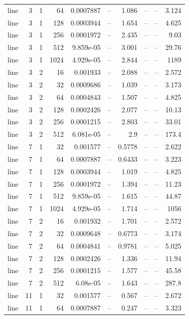 \begin{tabular}{lrrrrrrrrr}
line & 3 & 1 & 64 & 0.0007887 & -- & 1.086 & -- & -- & 3.124 \\
line & 3 & 1 & 128 & 0.0003944 & -- & 1.654 & -- & -- & 4.625 \\
line & 3 & 1 & 256 & 0.0001972 & -- & 2.435 & -- & -- & 9.03 \\
line & 3 & 1 & 512 & 9.859e-05 & -- & 3.001 & -- & -- & 29.76 \\
line & 3 & 1 & 1024 & 4.929e-05 & -- & 2.844 & -- & -- & 1189 \\
line & 3 & 2 & 16 & 0.001933 & -- & 2.088 & -- & -- & 2.572 \\
line & 3 & 2 & 32 & 0.0009686 & -- & 1.039 & -- & -- & 3.173 \\
line & 3 & 2 & 64 & 0.0004843 & -- & 1.507 & -- & -- & 4.825 \\
line & 3 & 2 & 128 & 0.0002426 & -- & 2.077 & -- & -- & 10.13 \\
line & 3 & 2 & 256 & 0.0001215 & -- & 2.803 & -- & -- & 33.01 \\
line & 3 & 2 & 512 & 6.081e-05 & -- & 2.9 & -- & -- & 173.4 \\
line & 7 & 1 & 32 & 0.001577 & -- & 0.5778 & -- & -- & 2.622 \\
line & 7 & 1 & 64 & 0.0007887 & -- & 0.6433 & -- & -- & 3.223 \\
line & 7 & 1 & 128 & 0.0003944 & -- & 1.019 & -- & -- & 4.825 \\
line & 7 & 1 & 256 & 0.0001972 & -- & 1.394 & -- & -- & 11.23 \\
line & 7 & 1 & 512 & 9.859e-05 & -- & 1.615 & -- & -- & 44.87 \\
line & 7 & 1 & 1024 & 4.929e-05 & -- & 1.714 & -- & -- & 1056 \\
line & 7 & 2 & 16 & 0.001932 & -- & 1.701 & -- & -- & 2.572 \\
line & 7 & 2 & 32 & 0.0009648 & -- & 0.6773 & -- & -- & 3.174 \\
line & 7 & 2 & 64 & 0.0004841 & -- & 0.9781 & -- & -- & 5.025 \\
line & 7 & 2 & 128 & 0.0002426 & -- & 1.336 & -- & -- & 11.94 \\
line & 7 & 2 & 256 & 0.0001215 & -- & 1.577 & -- & -- & 45.58 \\
line & 7 & 2 & 512 & 6.08e-05 & -- & 1.643 & -- & -- & 287.8 \\
line & 11 & 1 & 32 & 0.001577 & -- & 0.567 & -- & -- & 2.672 \\
line & 11 & 1 & 64 & 0.0007887 & -- & 0.247 & -- & -- & 3.323 \\

\end{tabular}

